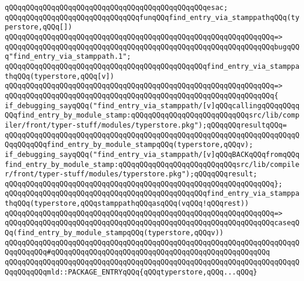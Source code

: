 \verb|qQQqqQQqqQQqqQQqqQQqqQQqqQQqqQQqqQQqqQQqqQQqqQQqesac;|\newline
\newline
\verb|qQQqqQQqqQQqqQQqqQQqqQQqqQQqqQQqfunqQQqfind_entry_via_stamppathqQQq(typerstore,qQQq[])|\newline
\verb|qQQqqQQqqQQqqQQqqQQqqQQqqQQqqQQqqQQqqQQqqQQqqQQqqQQqqQQqqQQqqQQq=>|\newline
\verb|qQQqqQQqqQQqqQQqqQQqqQQqqQQqqQQqqQQqqQQqqQQqqQQqqQQqqQQqqQQqqQQqbugqQQq"find_entry_via_stamppath.1";|\newline
\newline
\verb|qQQqqQQqqQQqqQQqqQQqqQQqqQQqqQQqqQQqqQQqqQQqqQQqfind_entry_via_stamppathqQQq(typerstore,qQQq[v])|\newline
\verb|qQQqqQQqqQQqqQQqqQQqqQQqqQQqqQQqqQQqqQQqqQQqqQQqqQQqqQQqqQQqqQQq=>|\newline
\verb|qQQqqQQqqQQqqQQqqQQqqQQqqQQqqQQqqQQqqQQqqQQqqQQqqQQqqQQqqQQqqQQq{|\newline
\verb|if_debugging_sayqQQq("find_entry_via_stamppath/[v]qQQqcallingqQQqqQQqqQQqfind_entry_by_module_stamp:qQQqqQQqqQQqqQQqqQQqqQQqqQQqsrc/lib/compiler/front/typer-stuff/modules/typerstore.pkg");qQQqqQQqresultqQQq=|\newline
\verb|qQQqqQQqqQQqqQQqqQQqqQQqqQQqqQQqqQQqqQQqqQQqqQQqqQQqqQQqqQQqqQQqqQQqqQQqqQQqqQQqfind_entry_by_module_stampqQQq(typerstore,qQQqv);|\newline
\verb|if_debugging_sayqQQq("find_entry_via_stamppath/[v]qQQqBACKqQQqfromqQQqfind_entry_by_module_stamp:qQQqqQQqqQQqqQQqqQQqqQQqqQQqsrc/lib/compiler/front/typer-stuff/modules/typerstore.pkg");qQQqqQQqresult;|\newline
\verb|qQQqqQQqqQQqqQQqqQQqqQQqqQQqqQQqqQQqqQQqqQQqqQQqqQQqqQQqqQQqqQQq};|\newline
\newline
\verb|qQQqqQQqqQQqqQQqqQQqqQQqqQQqqQQqqQQqqQQqqQQqqQQqfind_entry_via_stamppathqQQq(typerstore,qQQqstamppathqQQqasqQQq(vqQQq!qQQqrest))|\newline
\verb|qQQqqQQqqQQqqQQqqQQqqQQqqQQqqQQqqQQqqQQqqQQqqQQqqQQqqQQqqQQqqQQq=>|\newline
\verb|qQQqqQQqqQQqqQQqqQQqqQQqqQQqqQQqqQQqqQQqqQQqqQQqqQQqqQQqqQQqqQQqcaseqQQq(find_entry_by_module_stampqQQq(typerstore,qQQqv))|\newline
\verb|qQQqqQQqqQQqqQQqqQQqqQQqqQQqqQQqqQQqqQQqqQQqqQQqqQQqqQQqqQQqqQQqqQQqqQQqqQQqqQQq#qQQqqQQqqQQqqQQqqQQqqQQqqQQqqQQqqQQqqQQqqQQqqQQqqQQq|\newline
\verb|qQQqqQQqqQQqqQQqqQQqqQQqqQQqqQQqqQQqqQQqqQQqqQQqqQQqqQQqqQQqqQQqqQQqqQQqqQQqqQQqmld::PACKAGE_ENTRYqQQq{qQQqtyperstore,qQQq...qQQq}|\newline
